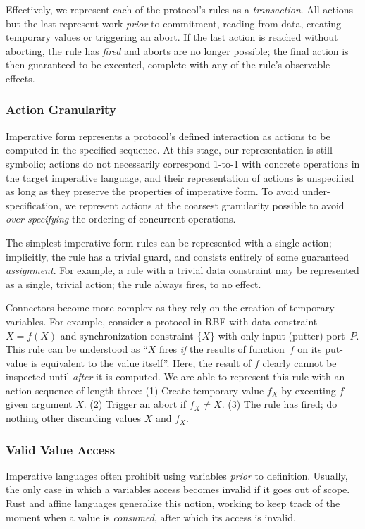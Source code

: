 Effectively, we represent each of the protocol's rules as a \textit{transaction}. All actions but the last represent work \textit{prior} to commitment, reading from data, creating temporary values or triggering an abort. If the last action is reached without aborting, the rule has \textit{fired} and aborts are no longer possible; the final action is then guaranteed to be executed, complete with any of the rule's observable effects. 

\subsubsection{Action Granularity}
Imperative form represents a protocol's defined interaction as actions to be computed in the specified sequence. At this stage, our representation is still symbolic; actions do not necessarily correspond 1-to-1 with concrete operations in the target imperative language, and their representation of actions is unspecified as long as they preserve the properties of imperative form. To avoid under-specification, we represent actions at the coarsest granularity possible to avoid \textit{over-specifying} the ordering of concurrent operations.

The simplest imperative form rules can be represented with a single action; implicitly, the rule has a trivial guard, and consists entirely of some guaranteed \textit{assignment}. For example, a rule with a trivial data constraint may be represented as a single, trivial action; the rule always fires, to no effect.

Connectors become more complex as they rely on the creation of temporary variables. For example, consider a protocol in RBF with data constraint $X=f(X)$ and synchronization constraint $\{X\}$ with only input (putter) port~$P$. This rule can be understood as ``$X$ fires \textit{if} the results of function~$f$ on its put-value is equivalent to the value itself''. Here, the result of $f$ clearly cannot be inspected until \textit{after} it is computed. We are able to represent this rule with an action sequence of length three: (1) Create temporary value $f_X$ by executing $f$ given argument $X$. (2) Trigger an abort if $f_X\neq{}X$. (3) The rule has fired; do nothing other discarding values $X$ and $f_X$.


\subsubsection{Valid Value Access}
Imperative languages often prohibit using variables \textit{prior} to definition. Usually, the only case in which a variables access becomes invalid if it goes out of scope. Rust and affine languages generalize this notion, working to keep track of the moment when a value is \textit{consumed}, after which its access is invalid. 

